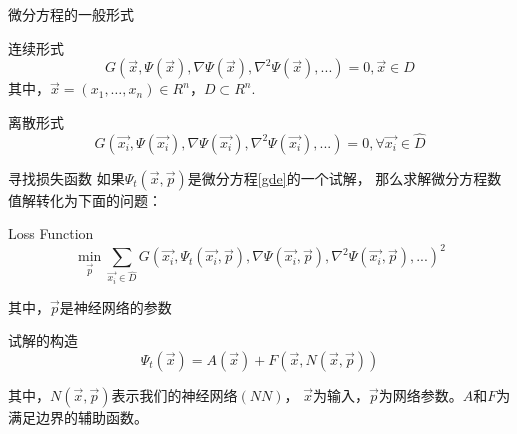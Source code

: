 \documentclass[hyperref,UTF8,11pt]{beamer}
\begin{document}
\begin{frame}{微分方程的一般形式}
\begin{block}{连续形式}
	\begin{equation}
	G\left(\vec{x}, \Psi(\vec{x}), \nabla \Psi(\vec{x}), \nabla^{2} \Psi(\vec{x}), ...\right)=0, \vec{x} \in D
	\end{equation}
其中，$\vec{x}=\left(x_{1}, \ldots, x_{n}\right) \in R^{n}$，$D \subset R^{n}$.
\end{block}
\begin{block}{离散形式}
\begin{equation}
	G\left( {\overrightarrow {{x_i}} ,\Psi \left( {\overrightarrow {{x_i}} } \right),\nabla \Psi \left( {\overrightarrow {{x_i}} } \right),{\nabla ^2}\Psi \left( {\overrightarrow {{x_i}} } \right),...} \right) = 0,\forall \overrightarrow {{x_i}}  \in \hat D
\label{gde}
\end{equation}
\end{block}
\end{frame}
\begin{frame}{寻找损失函数}
如果$\Psi_{t}(\vec{x}, \vec{p})$是微分方程\eqref{gde}的一个试解，
那么求解微分方程数值解转化为下面的问题\cite{Lagaris1998Artificial}：
\begin{block}{Loss Function}
	\begin{equation}
	\min _{\vec{p}} \sum_{\overrightarrow{x_{i}} \in \hat{D}} G\left(\overrightarrow{x_{i}}, \Psi_{t}\left(\overrightarrow{x_{i}}, \vec{p}\right), \nabla \Psi\left(\overrightarrow{x_{i}}, \vec{p}\right), \nabla^{2} \Psi\left(\overrightarrow{x_{i}}, \vec{p}\right), ... \right)^{2}
	\end{equation}
\end{block}
其中，$\vec{p}$是神经网络的参数

\begin{block}{试解的构造}
	\begin{equation}
	\Psi_{t}(\vec{x})=A(\vec{x})+F(\vec{x}, N(\vec{x}, \vec{p}))
	\label{equ:try}
	\end{equation}
\end{block}
其中，$N(\vec{x}, \vec{p})$表示我们的神经网络$(NN)$，
$\vec{x}$为输入，$\vec{p}$为网络参数。$A$和$F$为满足边界的辅助函数。
\end{frame}
\end{document}
